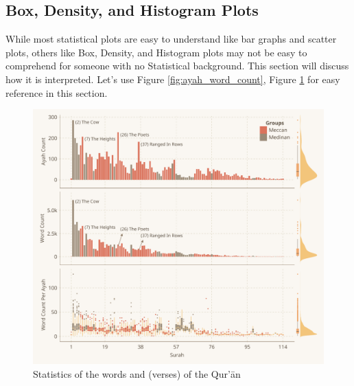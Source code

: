 \subsection{Box, Density, and Histogram Plots}
While most statistical plots are easy to understand like bar graphs and scatter plots, others like Box, Density, and Histogram plots may not be easy to comprehend for someone with no Statistical background. This section will discuss how it is interpreted. Let's use Figure \ref{fig:ayah_word_count}, Figure \ref{fig:ayah_word_count_with_desc} for easy reference in this section.
\begin{figure}[!b]
    \centering
    \includegraphics[width=\textwidth]{img/plot1.pdf}
    \caption{Statistics of the words and   (verses) of the Qur'\=an}
    \label{fig:ayah_word_count_with_desc}
\end{figure}

